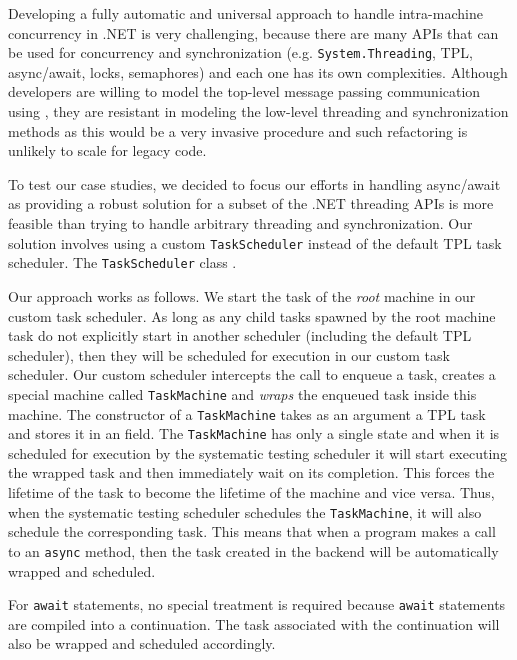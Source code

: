 Developing a fully automatic and universal approach to handle intra-machine concurrency in .NET is very challenging, because there are many APIs that can be used for concurrency and synchronization (e.g. \texttt{System.Threading}, TPL, async/await, locks, semaphores) and each one has its own complexities. Although developers are willing to model the top-level message passing communication using \psharp, they are resistant in modeling the low-level threading and synchronization methods as this would be a very invasive procedure and such refactoring is unlikely to scale for legacy code.

To test our case studies, we decided to focus our efforts in handling async/await as providing a robust solution for a subset of the .NET threading APIs is more feasible than trying to handle arbitrary threading and synchronization. Our solution involves using a custom \texttt{TaskScheduler} instead of the default TPL task scheduler. The \texttt{TaskScheduler} class .

Our approach works as follows. We start the task of the \emph{root} \psharp machine in our custom task scheduler. As long as any child tasks spawned by the root machine task do not explicitly start in another scheduler (including the default TPL scheduler), then they will be scheduled for execution in our custom task scheduler. Our custom scheduler intercepts the call to enqueue a task, creates a special machine called \texttt{TaskMachine} and \emph{wraps} the enqueued task inside this machine. The constructor of a \texttt{TaskMachine} takes as an argument a TPL task and stores it in an field. The \texttt{TaskMachine} has only a single state and when it is scheduled for execution by the \psharp systematic testing scheduler it will start executing the wrapped task and then immediately wait on its completion. This forces the lifetime of the task to become the lifetime of the machine and vice versa. Thus, when the \psharp systematic testing scheduler schedules the \texttt{TaskMachine}, it will also schedule the corresponding task. This means that when a \psharp program makes a call to an \texttt{async} method, then the task created in the backend will be automatically wrapped and scheduled.

For \texttt{await} statements, no special treatment is required because \texttt{await} statements are compiled into a continuation. The task associated with the continuation will also be wrapped and scheduled accordingly.
